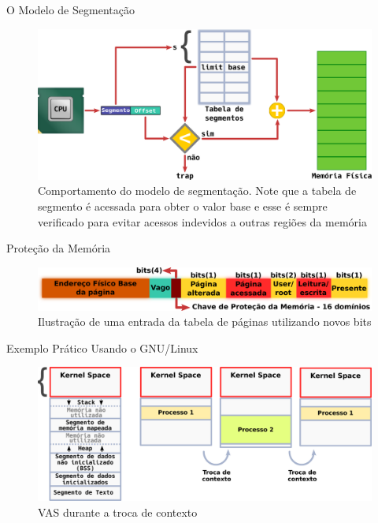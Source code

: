 \documentclass[xcolor={usenames,svgnames,dvipsnames},brazil,english,12pt,aspectratio=149]{beamer}
\begin{document}
\begin{frame}{O Modelo de Segmentação}
  \begin{figure}[!h]
    \centering
    \includegraphics[width=.80\textwidth]{segmentacao} 
    \caption*{Comportamento do modelo de segmentação. Note que a tabela de segmento é acessada para obter o valor base e esse é sempre verificado para evitar acessos indevidos a outras regiões da memória}
  \end{figure}
\end{frame}

\begin{frame}{Proteção da Memória}
  \begin{figure}[!h]
    \centering
    \includegraphics[width=.80\textwidth]{pte_domain} 
    \caption*{Ilustração de uma entrada da tabela de páginas utilizando novos bits}
  \end{figure}
\end{frame}

\begin{frame}{Exemplo Prático Usando o GNU/Linux}
  \begin{figure}[!h]
    \centering
    \includegraphics[width=\textwidth]{segmento_troca_contexto}
    \caption*{VAS durante a troca de contexto}
  \end{figure}
\end{frame}
\end{document}
